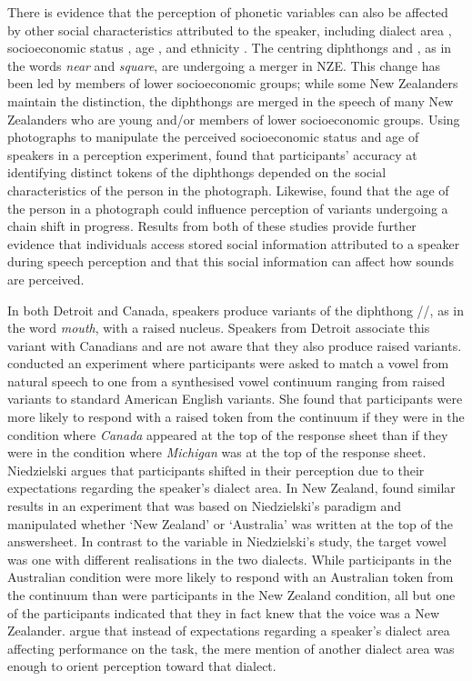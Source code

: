 There is evidence that the perception of phonetic variables can also be affected by other social characteristics at\-tri\-but\-ed to the spea\-ker, including dialect area \citep{niedzielski1999,haynolandrager2006}, socioeconomic status \citep{haywarrendrager2006}, age \citep{haywarrendrager2006,drager2006,dragerunderrev}, and ethnicity \citep{staumcasasanto2010}. The centring diphthongs  and , as in the words \textit{near} and \textit{square}, are undergoing a merger in NZE. This change has been led by members of lower socioeconomic groups; while some New Zealanders maintain the distinction, the diphthongs are merged in the speech of many New Zealanders who are young and/or members of lower socioeconomic groups. Using photographs to manipulate the perceived socioeconomic status and age of speakers in a perception experiment, \citet{haywarrendrager2006} found that participants' accuracy at identifying distinct tokens of the diphthongs depended on the social characteristics of the person in the photograph. Likewise, \citet{dragerunderrev} found that the age of the person in a photograph could influence perception of variants undergoing a chain shift in progress. Results from both of these studies provide further evidence that individuals access stored social information attributed to a speaker during speech perception and that this social information can affect how sounds are perceived.

In both Detroit and Canada, speakers produce variants of the diphthong //, as in the word \textit{mouth}, with a raised nucleus. Speakers from Detroit associate this variant with Canadians and are not aware that they also produce raised variants. \citet{niedzielski1999} conducted an experiment where participants were asked to match a vowel from natural speech to one from a synthesised vowel continuum ranging from raised variants to standard American English variants. She found that participants were more likely to respond with a raised token from the continuum if they were in the condition where \textit{Canada} appeared at the top of the response sheet than if they were in the condition where \textit{Michigan} was at the top of the response sheet. Niedzielski argues that participants shifted in their perception due to their expectations regarding the speaker's dialect area. In New Zealand, \citet{haynolandrager2006} found similar results in an experiment that was based on Niedzielski's paradigm and manipulated whether `New Zealand' or `Australia' was written at the top of the answersheet. In contrast to the variable in Niedzielski's study, the target vowel  was one with different realisations in the two dialects. While participants in the Australian condition were more likely to respond with an Australian token from the continuum than were participants in the New Zealand condition, all but one of the participants indicated that they in fact knew that the voice was a New Zealander. \citet{haynolandrager2006} argue that instead of expectations regarding a speaker's dialect area affecting performance on the task, the mere mention of another dialect area was enough to orient perception toward that dialect. 

